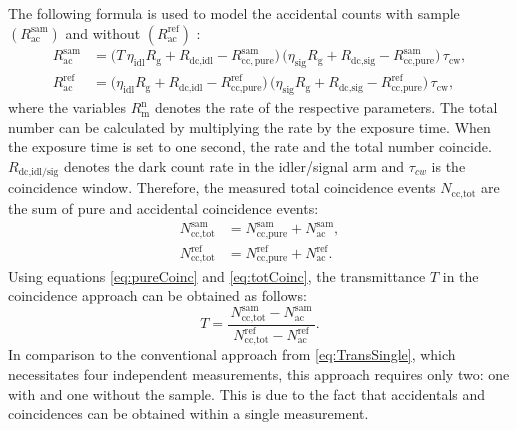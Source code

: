 The following formula is used to model the accidental counts with sample $\left(R_{\text{ac}}^{\text{sam}} \right)$ and without $\left(R_{\text{ac}}^{\text{ref}} \right)$ \cite{hayatTheoryPhotonCoincidence1999}:
\begin{equation}
	\begin{aligned}
		R_{\text{ac}}^{\text{sam}} 
		&= \Big( T\,\eta_{\text{idl}} R_{\mathrm{g}} + R_{\text{dc,idl}} - R_{\mathrm{cc,pure}}^{\mathrm{sam}} \Big) \,
		\Big( \eta_{\text{sig}} R_{\mathrm{g}} + R_{\text{dc,sig}} - R_{\text{cc,pure}}^{\text{sam}} \Big) \,
		\tau_{\text{cw}}, \\[0.75em]
		R_{\text{ac}}^{\text{ref}} 
		&= \Big( \eta_{\text{idl}} R_{\mathrm{g}} + R_{\text{dc,idl}} - R_{\text{cc,pure}}^{\text{ref}} \Big) \,
		\Big( \eta_{\text{sig}} R_{\mathrm{g}} + R_{\text{dc,sig}} - R_{\text{cc,pure}}^{\text{ref}} \Big) \,
		\tau_{\text{cw}},
	\end{aligned}
	\label{eq:AccCounts}
\end{equation}
where the variables $R_{\text{m}}^{\text{n}}$ denotes the rate of the respective parameters. The total number can be calculated by multiplying the rate by the exposure time. When the exposure time is set to one second, the rate and the total number coincide. $R_{\text{dc,idl/sig}}$ denotes the dark count rate in the idler/signal arm and $\tau_{cw}$ is the coincidence window.\newline
Therefore, the measured total coincidence events $N_{\text{cc,tot}}$ are the sum of pure and accidental coincidence events:
\begin{equation}
	\begin{aligned}
		N_{\text{cc,tot}}^{\text{sam}} &= N_{\text{cc,pure}}^{\text{sam}} + N_{\text{ac}}^{\text{sam}}, \\[0.5em]
		N_{\text{cc,tot}}^{\text{ref}} &= N_{\text{cc,pure}}^{\text{ref}} + N_{\text{ac}}^{\text{ref}}.
	\end{aligned}
	\label{eq:totCoinc}
\end{equation}
Using equations \ref{eq:pureCoinc} and \ref{eq:totCoinc}, the transmittance $T$ in the coincidence approach can be obtained as follows:
\begin{equation}
	T = 
	\frac{\,N_{\text{cc,tot}}^{\text{sam}} - N_{\text{ac}}^{\text{sam}}\,}
	{\,N_{\text{cc,tot}}^{\text{ref}} - N_{\text{ac}}^{\text{ref}}\,}.
	\label{eq:TransCoinc}
\end{equation}
In comparison to the conventional approach from \autoref{eq:TransSingle}, which necessitates four independent measurements, this approach requires only two: one with and one without the sample. This is due to the fact that  accidentals and coincidences can be obtained within a single measurement. \newline
